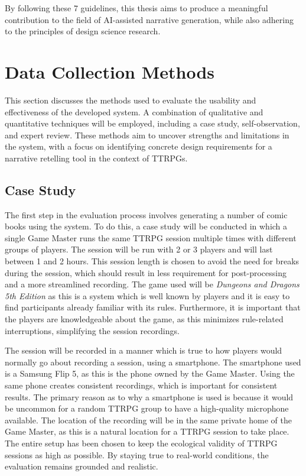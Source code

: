 By following these 7 guidelines, this thesis aims to produce a meaningful contribution to the field of AI-assisted narrative generation, while also adhering to the principles of design science research.

\section{Data Collection Methods} \label{sec:DataCollection}
This section discusses the methods used to evaluate the usability and effectiveness of the developed system. A combination of qualitative and quantitative techniques will be employed, including a case study, self-observation, and expert review. These methods aim to uncover strengths and limitations in the system, with a focus on identifying concrete design requirements for a narrative retelling tool in the context of TTRPGs.

\subsection*{Case Study}
The first step in the evaluation process involves generating a number of comic books using the system. To do this, a case study will be conducted in which a single Game Master runs the same TTRPG session multiple times with different groups of players. The session will be run with 2 or 3 players and will last between 1 and 2 hours. This session length is chosen to avoid the need for breaks during the session, which should result in less requirement for post-processing and a more streamlined recording. The game used will be \textit{Dungeons and Dragons 5th Edition} as this is a system which is well known by players and it is easy to find participants already familiar with its rules. Furthermore, it is important that the players are knowledgeable about the game, as this minimizes rule-related interruptions, simplifying the session recordings. 

The session will be recorded in a manner which is true to how players would normally go about recording a session, using a smartphone. The smartphone used is a Samsung Flip 5, as this is the phone owned by the Game Master. Using the same phone creates consistent recordings, which is important for consistent results. The primary reason as to why a smartphone is used is because it would be uncommon for a random TTRPG group to have a high-quality microphone available. The location of the recording will be in the same private home of the Game Master, as this is a natural location for a TTRPG session to take place. The entire setup has been chosen to keep the ecological validity of TTRPG sessions as high as possible\cite{kurniawan2004interaction}. By staying true to real-world conditions, the evaluation remains grounded and realistic.

